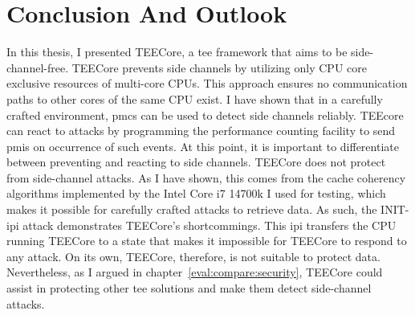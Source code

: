\chapter{Conclusion And Outlook}
\label{sec:conclusion}



In this thesis, I presented TEECore, a \gls{tee} framework that aims to be
side-channel-free. TEECore prevents side channels by utilizing only CPU core
exclusive resources of multi-core CPUs. This approach ensures no communication
paths to other cores of the same CPU exist. I have shown that in a carefully
crafted environment, \glspl{pmc} can be used to detect side channels reliably.
TEEcore can react to attacks by programming the performance counting facility to
send \glspl{pmi} on occurrence of such events. At this point, it is important to
differentiate between preventing and reacting to side channels. TEECore does not
protect from side-channel attacks. As I have shown, this comes from the cache
coherency algorithms implemented by the Intel Core i7 14700k I used for testing,
which makes it possible for carefully crafted attacks to retrieve data. As such,
the INIT-\gls{ipi} attack demonstrates TEECore's shortcommings.
This \gls{ipi} transfers the CPU running TEECore to a state that makes it
impossible for TEECore to respond to any attack. On its own, TEECore, therefore,
is not suitable to protect data. Nevertheless, as I argued in
chapter~\ref{eval:compare:security}, TEECore could assist in protecting other
\gls{tee} solutions and make them detect side-channel attacks.

